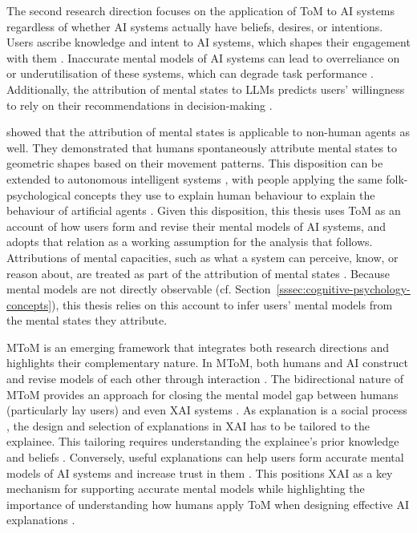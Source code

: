The second research direction focuses on the application of \ac{ToM} to \ac{AI} systems regardless of whether \ac{AI} systems actually have beliefs, desires, or intentions. Users ascribe knowledge and intent to AI systems, which shapes their engagement with them \parencite{Wang2021}. Inaccurate mental models of \ac{AI} systems can lead to overreliance on or underutilisation of these systems, which can degrade task performance \parencite{Jussupow2021}. Additionally, the attribution of mental states to \acp{LLM} predicts users' willingness to rely on their recommendations in decision-making \parencite{Colombatto2025}.

\textcite{Heider1944} showed that the attribution of mental states is applicable to non-human agents as well. They demonstrated that humans spontaneously attribute mental states to geometric shapes based on their movement patterns. This disposition can be extended to autonomous intelligent systems \parencite{deGraaf2017}, with people applying the same folk-psychological concepts they use to explain human behaviour to explain the behaviour of artificial agents \parencite[cf.][]{Miller2019}. Given this disposition, this thesis uses \ac{ToM} as an account of how users form and revise their mental models of \ac{AI} systems, and adopts that relation as a working assumption for the analysis that follows. Attributions of mental capacities, such as what a system can perceive, know, or reason about, are treated as part of the attribution of mental states \parencite[cf.][]{Colombatto2025}. Because mental models are not directly observable (cf. Section~\ref{sssec:cognitive-psychology-concepts}), this thesis relies on this account to infer users' mental models from the mental states they attribute.

\ac{MToM} is an emerging framework that integrates both research directions and highlights their complementary nature. In \ac{MToM}, both humans and \ac{AI} construct and revise models of each other through interaction \parencite{Wang2021, Wang2024a}. The bidirectional nature of \ac{MToM} provides an approach for closing the mental model gap between humans (particularly lay users) and even \ac{XAI} systems \parencite{Bienefeld2023}. As explanation is a social process \parencite{Miller2019}, the design and selection of explanations in \ac{XAI} has to be tailored to the explainee. This tailoring requires understanding the explainee's prior knowledge and beliefs \parencite{Halpern2005}. Conversely, useful explanations can help users form accurate mental models of \ac{AI} systems and increase trust in them \parencite{Shin2021}. This positions \ac{XAI} as a key mechanism for supporting accurate mental models while highlighting the importance of understanding how humans apply \ac{ToM} when designing effective \ac{AI} explanations \parencite{Hoffman2023}.

